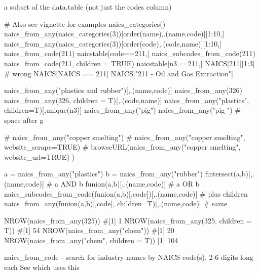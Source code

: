 \documentclass[a4paper]{book}
\begin{document}
%
\begin{Value}
a subset of the  data.table (not just the codes column)
\end{Value}
%
\begin{SeeAlso}\relax
{}     
\end{SeeAlso}
%
\begin{Examples}
\begin{ExampleCode}
# Also see vignette for examples
  naics_categories()
  naics_from_any(naics_categories(3))[order(name),.(name,code)][1:10,] 
  naics_from_any(naics_categories(3))[order(code),.(code,name)][1:10,] 
  naics_from_code(211)
  naicstable[code==211,]
  naics_subcodes_from_code(211)
  naics_from_code(211,  children = TRUE)
  naicstable[n3==211,]
  NAICS[211][1:3] # wrong
  NAICS[NAICS == 211]
  NAICS["211 - Oil and Gas Extraction"]
  
 naics_from_any("plastics and rubber")[,.(name,code)]
 naics_from_any(326)
 naics_from_any(326, children = T)[,.(code,name)]
 naics_from_any("plastics", children=T)[,unique(n3)] 
 naics_from_any("pig")
 naics_from_any("pig ") # space after g
 
 # naics_from_any("copper smelting")
 # naics_from_any("copper smelting", website_scrape=TRUE)
 # browseURL(naics_from_any("copper smelting", website_url=TRUE) )
 
 a = naics_from_any("plastics")
 b = naics_from_any("rubber") 
 fintersect(a,b)[,.(name,code)] #  a AND b
 funion(a,b)[,.(name,code)]     #  a OR  b
 naics_subcodes_from_code(funion(a,b)[,code])[,.(name,code)]   #  plus children
 naics_from_any(funion(a,b)[,code], children=T)[,.(name,code)] #  same
 
 NROW(naics_from_any(325))
#[1] 1
 NROW(naics_from_any(325, children = T))
#[1] 54
 NROW(naics_from_any("chem"))
#[1] 20
 NROW(naics_from_any("chem", children = T))
[1] 104


\end{ExampleCode}
\end{Examples}
%
\begin{Description}\relax
naics\_from\_code - search for industry names by NAICS code(s), 2-6 digits long each
See  which uses this
\end{Description}
\end{document}
